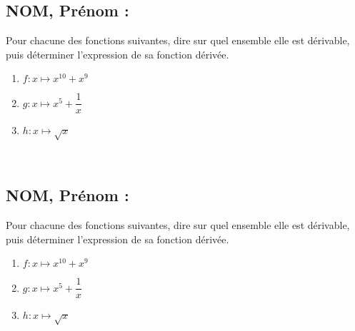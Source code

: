 \documentclass[a4paper,11pt,exos]{nsi} %
\begin{document}
\subsection*{NOM, Prénom : \dotfill} 


\maketitle




\begin{exercice}
    Pour chacune des fonctions suivantes, dire sur quel ensemble elle est dérivable, puis déterminer l'expression de sa fonction dérivée.
    \begin{multicols}{3}
        \begin{enumerate}
            \item $f:x\longmapsto { x}^{10}+{ x}^{9}$
        
            \item $g:x\longmapsto { x}^{5}+\dfrac{1}{ x}$
            \item $h:x\longmapsto \sqrt{ x}$
        \end{enumerate}
    \end{multicols}
    
\end{exercice}
\\



\subsection*{NOM, Prénom : \dotfill} 


\maketitle




\begin{exercice}
    Pour chacune des fonctions suivantes, dire sur quel ensemble elle est dérivable, puis déterminer l'expression de sa fonction dérivée.
    \begin{multicols}{3}
        \begin{enumerate}
            \item $f:x\longmapsto { x}^{10}+{ x}^{9}$
        
            \item $g:x\longmapsto { x}^{5}+\dfrac{1}{ x}$
            \item $h:x\longmapsto \sqrt{ x}$
        \end{enumerate}
    \end{multicols}
    
\end{exercice}

\end{document}
